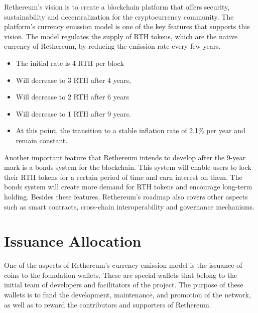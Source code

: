 \documentclass[a4paper,onecolumn, superscriptaddress,10pt,accepted=2020-05-01,issue=1, volume=2, shorttitle=papers]{compositionalityarticle}
\begin{document}
Rethereum's vision is to create a blockchain platform that offers security, sustainability and decentralization for the cryptocurrency community. The platform's currency emission model is one of the key features that supports this vision. The model regulates the supply of RTH tokens, which are the native currency of Rethereum, by reducing the emission rate every few years. 

\begin{itemize}
    \item The initial rate is 4 RTH per block
\end{itemize}
\begin{itemize}
    \item Will decrease to 3 RTH after 4 years,
\end{itemize}
\begin{itemize}
    \item Will decrease to 2 RTH after 6 years
\end{itemize}
\begin{itemize}
    \item Will decrease to 1 RTH after 9 years.
    \item At this point, the transition to a stable inflation rate of 2.1\% per year and remain constant.
\end{itemize}

Another important feature that Rethereum intends to develop after the 9-year mark is a bonds system for the blockchain. This system will enable users to lock their RTH tokens for a certain period of time and earn interest on them. The bonds system will create more demand for RTH tokens and encourage long-term holding. Besides these features, Rethereum's roadmap also covers other aspects such as smart contracts, cross-chain interoperability and governance mechanisms.

\newpage

\section{Issuance Allocation}

One of the aspects of Rethereum’s currency emission model is the issuance of coins to the foundation wallets. These are special wallets that belong to the initial team of developers and facilitators of the project. The purpose of these wallets is to fund the development, maintenance, and promotion of the network, as well as to reward the contributors and supporters of Rethereum.
\end{document}

